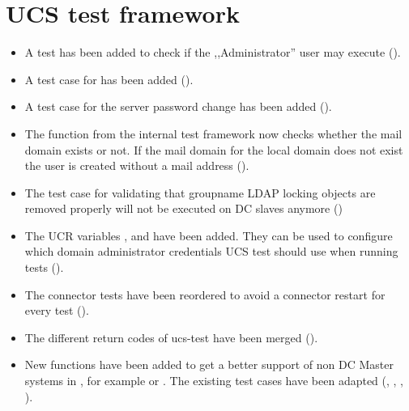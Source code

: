 \section{UCS test framework}
\begin{itemize}
\item A test has been added to check if the ,,Administrator'' user may execute
   ().

\item A test case for  has been added ().

\item A test case for the server password change has been added ().

\item The function  from the internal test framework now checks whether the
mail domain exists or not. If the mail domain for the local domain does not exist the user is
created without a mail address ().
\item The test case for validating that groupname LDAP locking objects
  are removed properly will not be executed on DC slaves anymore
  ()
\item The UCR variables ,
     and 
    have been added. They can be used to configure which domain administrator
    credentials UCS test should use when running tests ().

\item The connector tests have been reordered to avoid a connector restart for every test ().

\item The different return codes of ucs-test have been merged ().

\item New functions have been added to get a better support of non DC Master
systems in , for example  or
. The existing test cases have been adapted
(, , , ).

\end{itemize}

